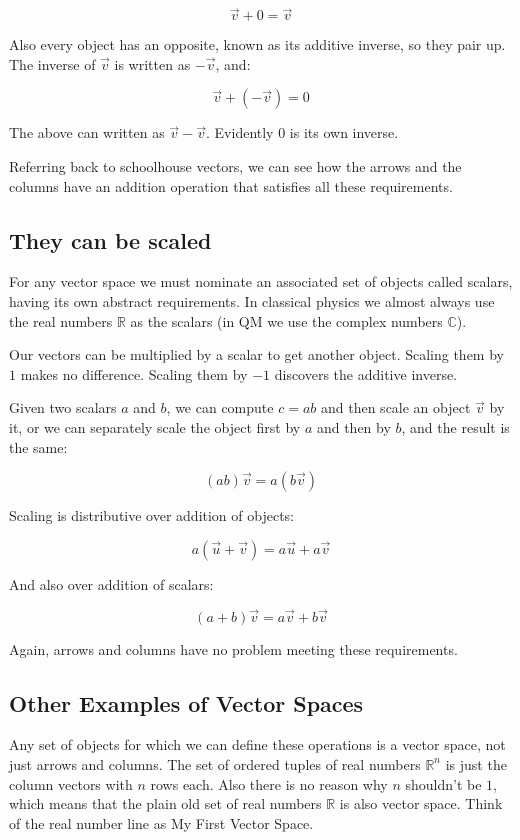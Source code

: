 $$\vec{v} + 0 = \vec{v}$$

Also every object has an opposite, known as its additive inverse, so they pair up. The inverse of $\vec{v}$ is written as $-\vec{v}$, and:

$$\vec{v} + (-\vec{v}) = 0$$

The above can written as $\vec{v} - \vec{v}$. Evidently $0$ is its own inverse.

Referring back to schoolhouse vectors, we can see how the arrows and the columns have an addition operation that satisfies all these requirements.

\subsection{They can be scaled}

For any vector space we must nominate an associated set of objects called scalars, having its own abstract requirements. In classical physics we almost always use the real numbers $\mathbb{R}$ as the scalars (in QM we use the complex numbers $\mathbb{C}$).

Our vectors can be multiplied by a scalar to get another object. Scaling them by $1$ makes no difference. Scaling them by $-1$ discovers the additive inverse.

Given two scalars $a$ and $b$, we can compute $c = ab$ and then scale an object $\vec{v}$ by it, or we can separately scale the object first by $a$ and then by $b$, and the result is the same:

$$(ab)\vec{v} = a(b\vec{v})$$

Scaling is distributive over addition of objects:

$$a(\vec{u} + \vec{v}) = a\vec{u} + a\vec{v}$$

And also over addition of scalars:

$$(a + b)\vec{v} = a\vec{v} + b\vec{v}$$

Again, arrows and columns have no problem meeting these requirements.

\subsection{Other Examples of Vector Spaces}

Any set of objects for which we can define these operations is a vector space, not just arrows and columns. The set of ordered tuples of real numbers $\mathbb{R}^n$ is just the column vectors with $n$ rows each. Also there is no reason why $n$ shouldn't be $1$, which means that the plain old set of real numbers $\mathbb{R}$ is also vector space. Think of the real number line as My First Vector Space\texttrademark.

